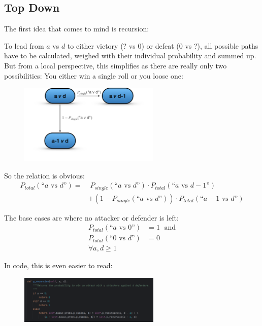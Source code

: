 \documentclass[11pt,a4paper]{article}
\begin{document}
    \subsection{Top Down}
    The first idea that comes to mind is recursion:

    To lead from $a$ vs $d$ to either victory (? vs 0) or defeat (0 vs ?), all possible paths have to be calculated, weighed with their individual probability and summed up.
    But from a local perspective, this simplifies as there are really only two possibilities: You either win a single roll or you loose one:

    \begin{figure}[H]
        \centering
        \includegraphics[width=0.6\textwidth]{../images/Basic Recursion.png}
    \end{figure}

    So the relation is obvious:
    \[ \begin{aligned}
           P_{total}(\text{``$a$ vs $d$''}) = &\; P_{single}(\text{``$a$ vs $d$''}) \cdot P_{total}(\text{``$a$ vs $d-1$''}) \\
           &+ (1 - P_{single}(\text{``$a$ vs $d$''})) \cdot P_{total}(\text{``$a-1$ vs $d$''})
    \end{aligned} \]

    The base cases are where no attacker or defender is left:
    \[ \begin{aligned}
           P_{total}(\text{``$a$ vs 0''}) &= 1 \; \text{ and}\\ P_{total}(\text{``0 vs $d$''}) &= 0 \\ \forall{a, d \geq 1}
    \end{aligned} \]

    In code, this is even easier to read:

    \begin{figure}[H]
        \centering
        \includegraphics[width=0.6\textwidth]{../images/Recursive.png}
    \end{figure}
\end{document}

